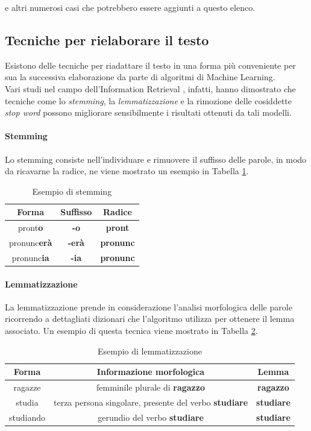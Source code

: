 \documentclass[12pt]{report}
\theoremstyle{definition}
\begin{document}
e altri numerosi casi che potrebbero essere aggiunti a questo elenco.
\subsection{Tecniche per rielaborare il testo}
Esistono delle tecniche per riadattare il testo in una forma più conveniente per sua la successiva elaborazione da parte di algoritmi di Machine Learning.
\\
Vari studi nel campo dell'Information Retrieval \cite{22}, infatti, hanno dimostrato che tecniche come lo \textit{stemming}, la \textit{lemmatizzazione} e la rimozione delle cosiddette \textit{stop word} possono migliorare sensibilmente i risultati ottenuti da tali modelli.

\paragraph{Stemming} Lo stemming consiste nell'individuare e rimuovere il suffisso delle parole, in modo da ricavarne la radice, ne viene mostrato un esempio in Tabella \ref{stemming}.
\begin{table}[!h]
\centering
 \begin{tabular}{|c|c|c|} 
 \hline 
 \textbf{Forma} & \textbf{Suffisso} & \textbf{Radice}
\\ [0.5ex] 
\hline
pront\textbf{o} & \textbf{-o} & \textbf{pront} \\
pronunc\textbf{erà} & \textbf{-erà} & \textbf{pronunc} \\
pronunc\textbf{ia} & \textbf{-ia} & \textbf{pronunc} \\
 \hline
\end{tabular}
\caption{Esempio di stemming}
\label{stemming}
\end{table}

\paragraph{Lemmatizzazione} La lemmatizzazione prende in considerazione l'analisi morfologica delle parole ricorrendo a dettagliati dizionari che l'algoritmo utilizza per ottenere il lemma associato.
Un esempio di questa tecnica viene mostrato in Tabella \ref{lemmatization}.
\begin{table}[!h]
\centering
 \begin{tabular}{|c|c|c|} 
 \hline 
 \textbf{Forma} & \textbf{Informazione morfologica} & \textbf{Lemma}
\\ [0.5ex] 
\hline
ragazze & femminile plurale di \textbf{ragazzo} & \textbf{ragazzo} \\
studia & terza persona singolare, presente del verbo \textbf{studiare} & \textbf{studiare} \\
studiando & gerundio del verbo \textbf{studiare} & \textbf{studiare} \\
 \hline
\end{tabular}
\caption{Esempio di lemmatizzazione}
\label{lemmatization}
\end{table}
\end{document}
